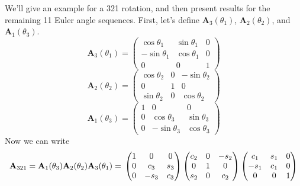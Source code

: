 We'll give an example for a 321 rotation, and then present results
for the remaining 11 Euler angle sequences.  First, let's define
$\mathbf{A}_3(\theta_1)$, $\mathbf{A}_2(\theta_2)$, and
$\mathbf{A}_1(\theta_3)$.
%
\begin{equation}
    \mathbf{A}_3(\theta_1) =
        \begin{pmatrix}
             \cos{\theta_1} & \sin{\theta_1} & 0 \\
            -\sin{\theta_1} & \cos{\theta_1} & 0 \\
                  0         &      0         & 1
        \end{pmatrix}
\end{equation}
\medskip
%
\begin{equation}
    \mathbf{A}_2(\theta_2) =
        \begin{pmatrix}
            \cos{\theta_2} & 0 & -\sin{\theta_2} \\
                 0         & 1 &       0         \\
            \sin{\theta_2} & 0 &  \cos{\theta_2}
        \end{pmatrix}
\end{equation}
\medskip
%
\begin{equation}
    \mathbf{A}_1(\theta_3) =
        \begin{pmatrix}
            1 &       0         &      0         \\
            0 &  \cos{\theta_3} & \sin{\theta_3} \\
            0 & -\sin{\theta_3} & \cos{\theta_3}
    \end{pmatrix}
\end{equation}
%
Now we can write
%
\begin{equation}
    \mathbf{A}_{321} = \mathbf{A}_1(\theta_3)\mathbf{A}_2(\theta_2)\mathbf{A}_3(\theta_1) = \\
    \medskip
    \begin{pmatrix}
        1 &   0  &  0  \\
        0 &  c_3 & s_3 \\
        0 & -s_3 & c_3
    \end{pmatrix}
    \begin{pmatrix}
        c_2 & 0 & -s_2 \\
         0  & 1 &   0  \\
        s_2 & 0 &  c_2
    \end{pmatrix}
    \begin{pmatrix}
         c_1 & s_1 & 0 \\
        -s_1 & c_1 & 0 \\
          0  &  0  & 1
    \end{pmatrix}
\end{equation}

